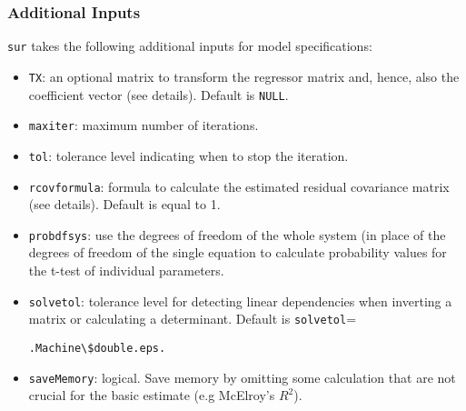 \subsubsection{Additional Inputs}
\texttt{sur} takes the following additional inputs for model
specifications:
\begin{itemize}
\item \texttt{TX}: an optional matrix to transform the regressor
matrix and, hence, also the coefficient vector (see details). Default is \texttt{NULL}.
\item \texttt{maxiter}: maximum number of iterations.
\item \texttt{tol}: tolerance level indicating when to stop the iteration.
\item \texttt{rcovformula}: formula to calculate the estimated residual covariance
matrix (see details). Default is equal to 1.
\item \texttt{probdfsys}: use the degrees of freedom of the whole system
(in place of the degrees of freedom of the single equation to calculate probability
values for the t-test of individual parameters. 
\item \texttt{solvetol}: tolerance level for detecting linear dependencies when 
inverting a matrix or calculating a determinant. Default is \texttt {solvetol}= \begin{verbatim}.Machine\$double.eps.\end{verbatim}
\item \texttt{saveMemory}: logical. Save memory by omitting some calculation that are
not crucial for the basic estimate (e.g McElroy's $R^2$).
\end{itemize}
